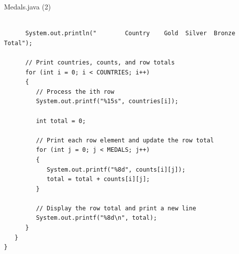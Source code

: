 \documentclass[aspectratio=43,10pt,t]{beamer}
\newcommand{\programrun}[2]{%
  \begin{minipage}{#1}
    {\bfseries\small\color{lineno} Program Run}\par\vskip1mm
    {\setlength{\fboxsep}{4pt}\colorbox{progbg}{%
      \parbox{\dimexpr\linewidth-8pt\relax}{\ttfamily\fontsize{6}{7.4}\selectfont #2}}}
  \end{minipage}}
\begin{document}
\begin{frame}[fragile]{Medals.java (2)}
\begin{lstlisting}[style=program,firstnumber=32,basicstyle=\ttfamily\fontsize{5.9}{7}\selectfont]

      System.out.println("        Country    Gold  Silver  Bronze   Total");

      // Print countries, counts, and row totals
      for (int i = 0; i < COUNTRIES; i++)
      {
         // Process the ith row
         System.out.printf("%15s", countries[i]);

         int total = 0;

         // Print each row element and update the row total
         for (int j = 0; j < MEDALS; j++)
         {
            System.out.printf("%8d", counts[i][j]);
            total = total + counts[i][j];
         }

         // Display the row total and print a new line
         System.out.printf("%8d\n", total);
      }
   }
}
\end{lstlisting}
\end{frame}

\end{document}
